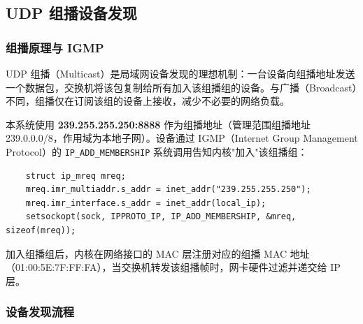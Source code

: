 \documentclass[12pt]{article}
\begin{document}
\subsection{UDP 组播设备发现}

\subsubsection{组播原理与 IGMP}

UDP 组播（Multicast）是局域网设备发现的理想机制：一台设备向组播地址发送一个数据包，交换机将该包复制给所有加入该组播组的设备。与广播（Broadcast）不同，组播仅在订阅该组的设备上接收，减少不必要的网络负载。

本系统使用 \textbf{239.255.255.250:8888} 作为组播地址（管理范围组播地址 239.0.0.0/8，作用域为本地子网）。设备通过 IGMP（Internet Group Management Protocol）的 \texttt{IP\_ADD\_MEMBERSHIP} 系统调用告知内核"加入"该组播组：

\begin{verbatim}
    struct ip_mreq mreq;
    mreq.imr_multiaddr.s_addr = inet_addr("239.255.255.250");
    mreq.imr_interface.s_addr = inet_addr(local_ip);
    setsockopt(sock, IPPROTO_IP, IP_ADD_MEMBERSHIP, &mreq, sizeof(mreq));
\end{verbatim}

加入组播组后，内核在网络接口的 MAC 层注册对应的组播 MAC 地址 （01:00:5E:7F:FF:FA），当交换机转发该组播帧时，网卡硬件过滤并递交给 IP 层。

\subsubsection{设备发现流程}
\end{document}
